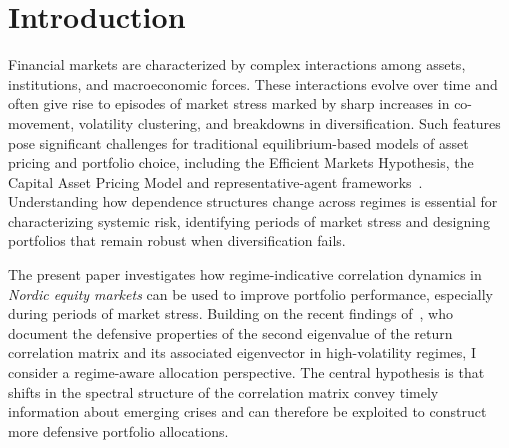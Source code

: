 \documentclass[pdflatex,sn-basic]{sn-jnl}%
\theoremstyle{thmstyleone}%
\theoremstyle{thmstyletwo}%
\theoremstyle{thmstylethree}%
\begin{document}





\maketitle

\section{Introduction}
\label{sec:intro}

Financial markets are characterized by complex interactions among assets,
institutions, and macroeconomic forces. These interactions evolve over time and
often give rise to episodes of market stress marked by sharp increases in
co-movement, volatility clustering, and breakdowns in diversification. Such
features pose significant challenges for traditional equilibrium-based models
of asset pricing and portfolio choice, including the Efficient Markets
Hypothesis, the Capital Asset Pricing Model and representative-agent
frameworks~\citep{campbellLo1997econometrics,osullivan2018capital,lucas1978asset}.
Understanding how dependence structures change across regimes is essential for
characterizing systemic risk, identifying periods of market stress and
designing portfolios that remain robust when diversification fails. 

The present paper investigates how regime-indicative correlation dynamics
in \emph{Nordic equity markets} can be used to improve portfolio performance, especially during
periods of market stress. Building on the recent findings of~\citet{molero2025random}, who document 
the defensive properties of the second eigenvalue of the return correlation matrix and its associated 
eigenvector in high-volatility regimes, I consider a regime-aware allocation perspective. The central 
hypothesis is that shifts in the spectral structure of the correlation matrix convey timely information 
about emerging crises and can therefore be exploited to construct more defensive portfolio allocations.
\end{document}
